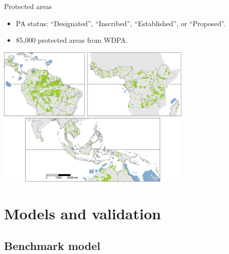\documentclass[10pt,table,dvipsnames,compress]{beamer}
\begin{document}
\begin{frame}[label={sec:org0304202}]{Protected areas}
\begin{itemize}
\item PA status: ``Designated'', ``Inscribed'', ``Established'', or ``Proposed''.
\item 85,000 protected areas from WDPA.
\end{itemize}

\begin{center}
\includegraphics[width=0.7\textwidth]{figs/sm/pa.png}
\end{center}
\end{frame}

\section{Models and validation}
\label{sec:orge1c0621}

\subsection{Benchmark model}
\label{sec:org4d6d90a}
\end{document}
